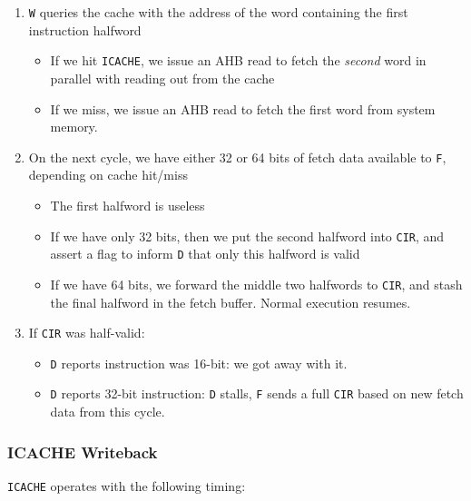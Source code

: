 \documentclass{article}
\begin{document}
\begin{enumerate}
	\item \texttt{W} queries the cache with the address of the word containing the first instruction halfword
	\begin{itemize}
		\item If we hit \texttt{ICACHE}, we issue an AHB read to fetch the \textit{second} word in parallel with reading out from the cache
		\item If we miss, we issue an AHB read to fetch the first word from system memory.
	\end{itemize}
	\item On the next cycle, we have either 32 or 64 bits of fetch data available to \texttt{F}, depending on cache hit/miss
	\begin{itemize}
		\item The first halfword is useless
		\item If we have only 32 bits, then we put the second halfword into \texttt{CIR}, and assert a flag to inform \texttt{D} that only this halfword is valid
		\item If we have 64 bits, we forward the middle two halfwords to \texttt{CIR}, and stash the final halfword in the fetch buffer. Normal execution resumes.
	\end{itemize}
	\item If \texttt{CIR} was half-valid:
		\begin{itemize}
			\item \texttt{D} reports instruction was 16-bit: we got away with it.
			\item \texttt{D} reports 32-bit instruction: \texttt{D} stalls, \texttt{F} sends a full \texttt{CIR} based on new fetch data from this cycle.
		\end{itemize}
\end{enumerate}


\subsubsection{ICACHE Writeback}

\texttt{ICACHE} operates with the following timing:
\end{document}

